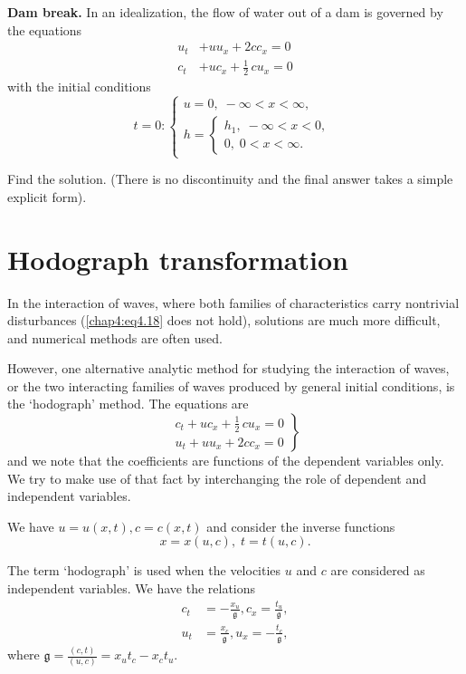 \begin{problem*}
{\bf Dam break.} In an idealization, the flow of water out of a dam is governed by the equations
\begin{align*}
u_t &+ uu_x+2cc_x=0\\
c_t &+ uc_x+\frac{1}{2}\,cu_x=0
\end{align*}
with the initial conditions
\begin{equation*}
t=0:
\begin{cases}
u=0,\; -\infty < x < \infty,\\
h=
\begin{cases}
h_1,\; -\infty < x < 0,\\
0,\; 0< x < \infty.
\end{cases}
\end{cases}
\end{equation*}
\end{problem*}

Find the solution. (There is no discontinuity and the final answer takes a simple explicit form).

\section{Hodograph transformation}\label{chap4:sec4.5}\pageoriginale

In the interaction of waves, where both families of characteristics carry nontrivial disturbances (\ie \eqref{chap4:eq4.18} does not hold), solutions are much more difficult, and numerical methods are often used.

However, one alternative analytic method for studying the interaction of waves, or the two interacting families of waves produced by general initial conditions, is the `hodograph' method. The equations are 
\begin{equation}
\left.
\begin{aligned}
c_t +uc_x+\frac{1}{2}\,cu_x=0\\
u_t+uu_x+2cc_x=0
\end{aligned}
\right\}\tag{4.20}\label{chap4:eq4.20}
\end{equation}
and we note that the coefficients are functions of the dependent variables only. We try to make use of that fact by interchanging the role of dependent and independent variables.

We have $u=u(x,t),c=c(x,t)$ and consider the inverse functions 
$$
x=x(u,c),\;t=t(u,c).
$$

The term `hodograph' is used when the velocities $u$ and $c$ are considered as independent variables. We have the relations
\begin{align*}
c_t &= -\frac{x_u}{\mathfrak{g}}, c_x = \frac{t_u}{\mathfrak{g}},\\
u_t &=\frac{x_c}{\mathfrak{g}}, u_x= -\frac{t_c}{\mathfrak{g}},
\end{align*}
where $\mathfrak{g}=\frac{(c,t)}{(u,c)}=x_ut_c-x_ct_u$.

